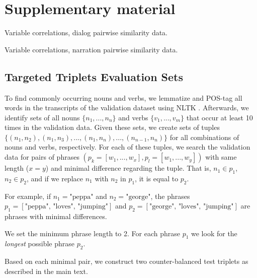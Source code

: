 \appendix

\section{Supplementary material}

\begin{table}
  \centering
  \begin{adjustbox}{angle=90}
    
  \end{adjustbox}
  \caption{Variable correlations, dialog pairwise similarity data.}
  \label{tab:dialogvarcor}
\end{table}
\begin{table}
  \centering
  \begin{adjustbox}{angle=90}
    
  \end{adjustbox}
  \caption{Variable correlations, narration pairwise similarity data.}
  \label{tab:narrationvarcor}
\end{table}


\subsection{Targeted Triplets Evaluation Sets}\label{app:targeted_triplets_eval}

To find commonly occurring nouns and verbs, we lemmatize and POS-tag all words in the transcripts of the validation dataset using NLTK \citep{bird-2006-nltk}. Afterwards, we identify sets of all nouns $\{n_1, ..., n_n\}$ and verbs $\{v_1, ..., v_m\}$ that occur at least 10 times in the validation data. Given these sets, we create sets of tuples $\{(n_1, n_2), (n_1, n_3), ..., (n_1, n_n), ...,  (n_{n-1}, n_n)\}$ for all combinations of nouns and verbs, respectively. For each of these tuples, we search the validation data for pairs of phrases $(p_k=[w_1, ..., w_x], p_l=[w_1, ..., w_y])$ with same length ($x=y$) and minimal difference regarding the tuple. That is, $n_1 \in p_1$, $n_2 \in p_2$, and if we replace $n_1$ with $n_2$ in $p_1$, it is equal to $p_2$.

For example, if $n_1 = \text{"peppa"}$ and $n_2 = \text{"george"}$, the phrases $p_1 = [\text{"peppa", "loves", "jumping"}]$ and $p_2 = [\text{"george", "loves", "jumping"}]$ are phrases with minimal differences.

We set the minimum phrase length to 2. For each phrase $p_1$ we look for the \textit{longest} possible phrase $p_2$.

Based on each minimal pair, we construct two counter-balanced test triplets as described in the main text.
